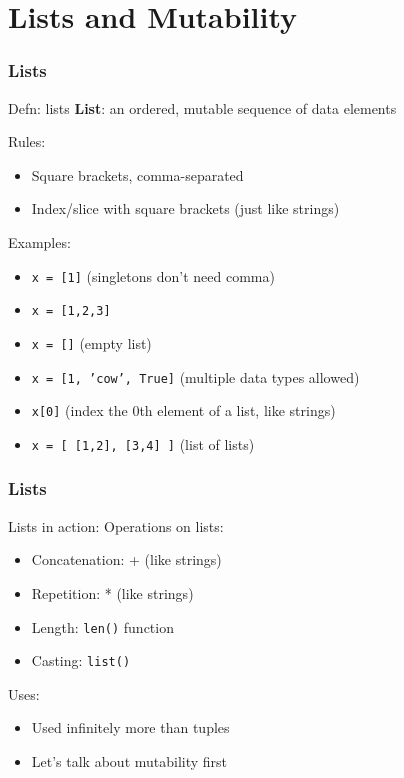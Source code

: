 \documentclass{beamer}
\newcommand{\code}[1]{\texttt{#1}}
\begin{document}
\section{Lists and Mutability}

\begin{frame}	
\end{frame}

\begin{frame}	
	\frametitle{Lists}
	
	\begin{alertblock}{Defn: lists}
		\textbf{List}: an ordered, mutable sequence of data elements
		
		\vspace{10pt}
		Rules:
		\begin{itemize}
			\item Square brackets, comma-separated
			\item Index/slice with square brackets (just like strings)
		\end{itemize}
		
		\vspace{10pt}
		Examples:
		\begin{itemize}
			\item \code{x = [1]} (singletons don't need comma)
			\item \code{x = [1,2,3]}
			\item \code{x = []} (empty list)
			\item \code{x = [1, 'cow', True]} (multiple data types allowed)
			\item \code{x[0]} (index the 0th element of a list, like strings)
			\item \code{x = [ [1,2], [3,4] ]} (list of lists)
		\end{itemize}
	\end{alertblock}
	
\end{frame}

\begin{frame}	
	\frametitle{Lists}
	
	\begin{block}{Lists in action:}
		Operations on lists:
		\begin{itemize}
			\item Concatenation: + (like strings)
			\item Repetition: * (like strings)
			\item Length: \code{len()} function
			\item Casting: \code{list()}
		\end{itemize}
		
		\vspace{10pt}
		Uses:
		\begin{itemize}
			\item Used infinitely more than tuples
			\item Let's talk about mutability first
		\end{itemize}
	\end{block}
	
\end{frame}
\end{document}
